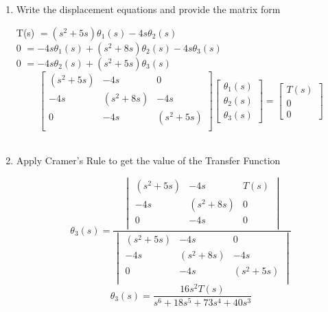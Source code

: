 ﻿\documentclass[11pt]{article}
\begin{document}
\begin{enumerate}[label=(\alph*),itemindent=*, leftmargin=*, nolistsep]
\begin{center}
            \vspace{15pt}
    
            $\sum T_0 = 0 \quad\text{(clockwise, +)}$ \\ \vspace{10pt}
            $0 = 4s\theta_2(s) - (s^2 + 5s)\theta_3(s)$ \\ \vspace{10pt}
            $0 = -4s\theta_2(s) + (s^2 + 5s)\theta_3(s)$ 

    \end{center}
\vspace{15pt}
    \item Write the displacement equations and provide the matrix form
\begin{center}
    T(s) $= (s^2 + 5s)\theta_1(s) - 4s\theta_2(s)$\\
    0 $= -4s\theta_1(s) + (s^2 + 8s)\theta_2(s) - 4s\theta_3(s)$\\
    0 $= -4s\theta_2(s) + (s^2 + 5s)\theta_3(s)$\\
    \[
        \begin{bmatrix}
        (s^2 + 5s) & -4s & 0\\
        -4s & (s^2 + 8s) & -4s\\
        0 & -4s & (s^2 + 5s)\\
        \end{bmatrix}
        \begin{bmatrix}
        \theta_1(s) \\
        \theta_2(s) \\
        \theta_3(s)
        \end{bmatrix}
        =
        \begin{bmatrix}
        T(s)\\
        0\\
        0
        \end{bmatrix}
    \]\\
\end{center}
\vspace{15pt}
    \item Apply Cramer's Rule to get the value of the Transfer Function
\begin{center}
    \[
        \theta_3(s) = 
            \frac{\begin{vmatrix}
                (s^2 + 5s) & -4s & T(s)\\
                -4s & (s^2 + 8s) & 0\\
                0 & -4s & 0\\
            \end{vmatrix}
        }{\begin{vmatrix}
                (s^2 + 5s) & -4s & 0\\
                -4s & (s^2 + 8s) & -4s\\
                0 & -4s & (s^2 + 5s)\\
            \end{vmatrix}
        }
    \]
    \[
    \theta_3(s) = \frac{16s^2 T(s)}{s^6 + 18s^5 + 73s^4 + 40s^3}
    \] 


\end{center}
\end{enumerate}
\end{document}
